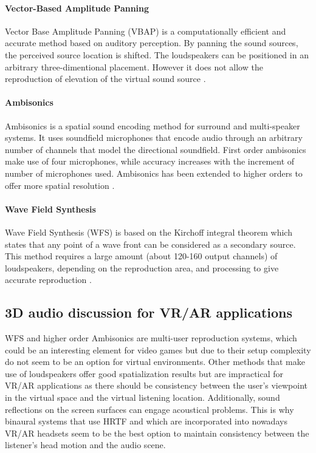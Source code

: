 \paragraph{Vector-Based Amplitude Panning}\label{par:vbap}
\hfill \break

Vector Base Amplitude Panning (\gls{VBAP}) is a computationally efficient and accurate method based on auditory perception. By panning the sound sources, the perceived source location is shifted. The loudspeakers can be positioned in an arbitrary three-dimentional placement. However it does not allow the reproduction of elevation of the virtual sound source \cite{pulkki1997virtual}.

\paragraph{Ambisonics}\label{par:ambisonics}
\hfill \break

Ambisonics is a spatial sound encoding method for surround and multi-speaker systems. It uses soundfield microphones that encode audio through an arbitrary number of channels that model the directional soundfield. First order ambisonics make use of four microphones, while accuracy increases with the increment of number of microphones used.  Ambisonics has been extended to higher orders to offer more spatial resolution \cite{daniel2003further}. 

\paragraph{Wave Field Synthesis}\label{par:wfs}
\hfill \break

Wave Field Synthesis (\gls{WFS}) is based on the Kirchoff integral theorem which states that any point of a wave front can be considered as a secondary source. This method requires a large amount (about 120-160 output channels) of loudspeakers, depending on the reproduction area, and processing to give accurate reproduction \cite{funkhouser2002sounds}.

\subsection{3D audio discussion for VR/AR applications}

\gls{WFS} and higher order Ambisonics are multi-user reproduction systems, which could be an interesting element for video games but due to their setup complexity do not seem to be an option for virtual environments. Other methods that make use of loudspeakers offer good spatialization results but are impractical for \gls{VR}/\gls{AR} applications as there should be consistency between the user's viewpoint in the virtual space and the virtual listening location. Additionally, sound reflections on the screen surfaces can engage acoustical problems. This is why binaural systems that use \gls{HRTF} and which are incorporated into nowadays \gls{VR}/\gls{AR} headsets seem to be the best option to maintain consistency between the listener's head motion and the audio scene.